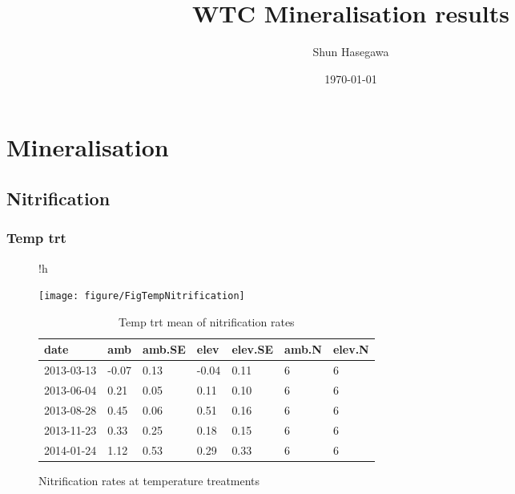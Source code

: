 \documentclass[11pt]{article}\usepackage[]{graphicx}\usepackage[]{color}
\title{WTC Mineralisation results}
\author{Shun Hasegawa}
\date{\today}
\makeatletter
\def\maxwidth{ %
  \ifdim\Gin@nat@width>\linewidth
    \linewidth
  \else
    \Gin@nat@width
  \fi
}
\newenvironment{knitrout}{}{} %
\makeatother
\begin{document}
\maketitle
\clearpage
\tableofcontents
\clearpage


\section{Mineralisation}

\subsection{Nitrification}

\subsubsection{Temp trt}

\begin{figure}{!h}\label{figure:temp_nitrification}

\begin{center}

\begin{knitrout}
\color{fgcolor}
\texttt{[image: figure/FigTempNitrification]} 

\end{knitrout}


\begin{table}[H]
\centering
\caption{Temp trt mean of nitrification rates} 
\label{table:temp_nitrification}
\begin{tabular}{lllllll}
  \hline
date & amb & amb.SE & elev & elev.SE & amb.N & elev.N \\ 
  \hline
2013-03-13 & -0.07 & 0.13 & -0.04 & 0.11 &   6 &   6 \\ 
  2013-06-04 & 0.21 & 0.05 & 0.11 & 0.10 &   6 &   6 \\ 
  2013-08-28 & 0.45 & 0.06 & 0.51 & 0.16 &   6 &   6 \\ 
  2013-11-23 & 0.33 & 0.25 & 0.18 & 0.15 &   6 &   6 \\ 
  2014-01-24 & 1.12 & 0.53 & 0.29 & 0.33 &   6 &   6 \\ 
   \hline
\end{tabular}
\end{table}




\caption{Nitrification rates at temperature treatments}
\end{center}
\end{figure}
\end{document}
